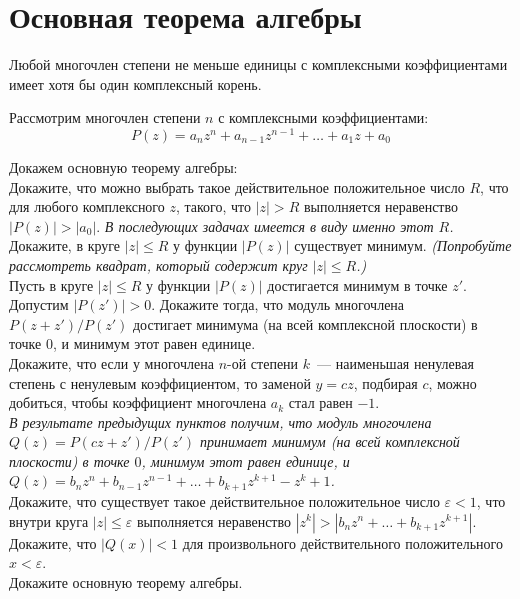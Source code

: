 

\section*{Основная теорема алгебры}


\theorem
Любой многочлен степени не меньше единицы с комплексными коэффициентами имеет
хотя бы один комплексный корень.

Рассмотрим многочлен степени $n$ с комплексными коэффициентами:
\[
    P(z)
=
    a_n z^n + a_{n-1} z^{n-1} + \ldots + a_1 z + a_0
\]

\begin{problems}

\item
Докажем основную теорему алгебры:
\\
\sbp
Докажите, что можно выбрать такое действительное положительное число $R$, что
для любого комплексного $z$, такого, что $|z| > R$ выполняется неравенство
$|P(z)| > |a_0|$.
\emph{В последующих задачах имеется в виду именно этот $R$.}
\\
\sbp
Докажите, в круге $|z| \leq R$ у функции $|P(z)|$ существует минимум.
\emph{(Попробуйте рассмотреть квадрат, который содержит круг $|z| \leq R$.)}
\\
\sbp
Пусть в круге $|z| \leq R$ у функции $|P(z)|$ достигается минимум в точке $z'$.
Допустим $|P(z')| > 0$.
Докажите тогда, что модуль многочлена $P(z+z') / P(z')$ достигает минимума
(на всей комплексной плоскости) в точке $0$, и минимум этот равен единице.
\\
\sbp
Докажите, что если у многочлена $n$-ой степени $k$~--- наименьшая ненулевая
степень с ненулевым коэффициентом, то заменой $y = c z$, подбирая $c$, можно
добиться, чтобы коэффициент многочлена $a_k$ стал равен $-1$.
\\\emph{В результате предыдущих пунктов получим, что модуль многочлена
$Q(z) = P(c z + z') / P(z')$ принимает минимум (на всей комплексной плоскости)
в точке $0$, минимум этот равен единице, и
\(
    Q(z)
=
    b_n z^n + b_{n-1} z^{n-1} + \ldots + b_{k+1} z^{k+1} - z^k + 1
\).}
\\
\sbp
Докажите, что существует такое действительное положительное число
$\varepsilon < 1$, что внутри круга $|z| \leq \varepsilon$ выполняется
неравенство
$|z^k| > |b_n z^n + \ldots + b_{k+1} z^{k+1}|$.
\\
\sbp
Докажите, что $|Q(x)| < 1$ для произвольного действительного положительного
$x < \varepsilon$.
\\
\sbp
Докажите основную теорему алгебры.


\end{problems}
